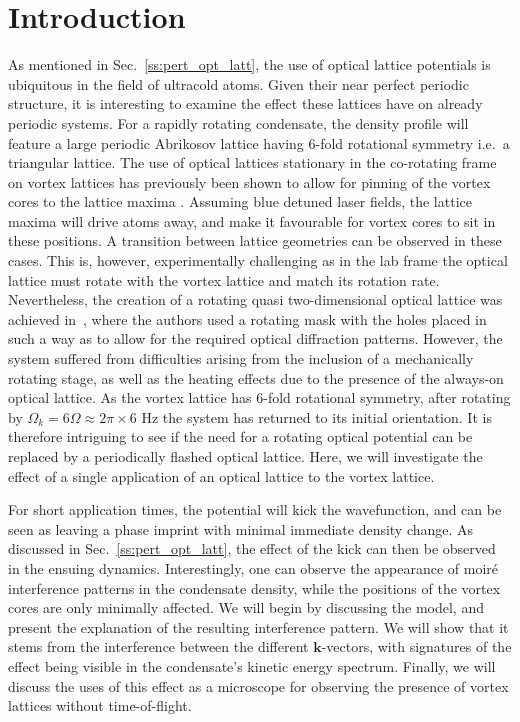 \section{Introduction}

As mentioned in Sec.~\ref{ss:pert_opt_latt}, the use of optical lattice potentials is ubiquitous in the field of ultracold atoms. Given their near perfect periodic structure, it is interesting to examine the effect these lattices have on already periodic systems. For a rapidly rotating condensate, the density profile will feature a large periodic Abrikosov lattice having $6$-fold rotational symmetry i.e.\ a triangular lattice. The use of optical lattices stationary in the co-rotating frame on vortex lattices has previously been shown to allow for pinning of the vortex cores to the lattice maxima \cite{OL:Reijnders_prl_2004,Vtx:Tung_prl_2006}. Assuming blue detuned laser fields, the lattice maxima will drive atoms away, and make it favourable for vortex cores to sit in these positions. A transition between lattice geometries can be observed in these cases. This is, however, experimentally challenging as in the lab frame the optical lattice must rotate with the vortex lattice and match its rotation rate. Nevertheless, the creation of a rotating quasi two-dimensional optical lattice was achieved in~\cite{Vtx:Tung_prl_2006}, where the authors used a rotating mask with the holes placed in such a way as to allow for the required optical diffraction patterns. However, the system suffered from difficulties arising from the inclusion of a mechanically rotating stage, as well as the heating effects due to the presence of the always-on optical lattice. As the vortex lattice has 6-fold rotational symmetry, after rotating by
$\Omega_{k}=6\Omega\approx 2\pi\times 6$ Hz the system has returned to its initial orientation. It is therefore intriguing to see if the need for a rotating optical potential can be replaced by a periodically flashed optical lattice. Here, we will investigate the effect of a single application of an optical lattice to the vortex lattice.

 For short application times, the potential will kick the wavefunction, and can be seen as leaving a phase imprint with minimal immediate density change. As discussed in Sec.~\ref{ss:pert_opt_latt}, the effect of the kick can then be observed in the ensuing dynamics. Interestingly, one can observe the appearance of moir\'e interference patterns in the condensate density, while the positions of the vortex cores are only minimally affected. We will begin by discussing the model, and present the explanation of the resulting interference pattern. We will show that it stems from the interference between the different $\mathbf{k}$-vectors, with signatures of the effect being visible in the condensate's kinetic energy spectrum. Finally, we will discuss the uses of this effect as a microscope for observing the presence of vortex lattices without time-of-flight.

